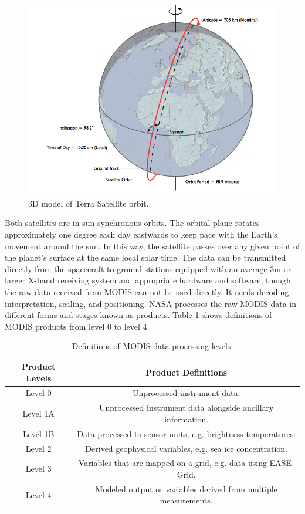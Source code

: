 \documentclass{article}\usepackage[]{graphicx}\usepackage[]{color}
\begin{document}
\begin{figure}[!ht]
\begin{center}
\includegraphics[width=12cm]{inclination.png}
\caption{3D model of Terra Satellite orbit.\citep{king2007our}}
\label{Fig: 3DTerra}
\end{center}
\end{figure}



Both satellites are in sun-synchronous orbits. The orbital plane rotates approximately one degree each day eastwards to keep pace with the Earth's movement around the sun. In this way, the satellite passes over any given point of the planet's surface at the same local solar time. The data can be transmitted directly from the spacecraft to ground stations equipped with an average 3m or larger X-band receiving system and appropriate hardware and software, though the raw data received from MODIS can not be used directly.  It needs decoding, interpretation, scaling, and positioning. NASA processes the raw MODIS data in different forms and stages known as products. Table \ref{Tab:modisproduct} shows definitions of MODIS products from level 0 to level 4.

\begin{table}[!ht]
\caption{Definitions of MODIS data processing levels.}\label{Tab:modisproduct}
\centering
\begin{tabular}{|c|c|}
\hline
Product Levels & Product Definitions\\
\hline
Level 0 & Unprocessed instrument data.\\
\hline
Level 1A & Unprocessed instrument data alongside ancillary information.\\
\hline
Level 1B & Data processed to sensor units, e.g. brightness temperatures.\\
\hline
Level 2 & Derived geophysical variables, e.g. sea ice concentration.\\
\hline
Level 3 & Variables that are mapped on a grid, e.g. data using EASE-Grid.\\
\hline
Level 4 & Modeled output or variables derived from multiple measurements.\\
\hline
\end{tabular}
\end{table}
\end{document}
